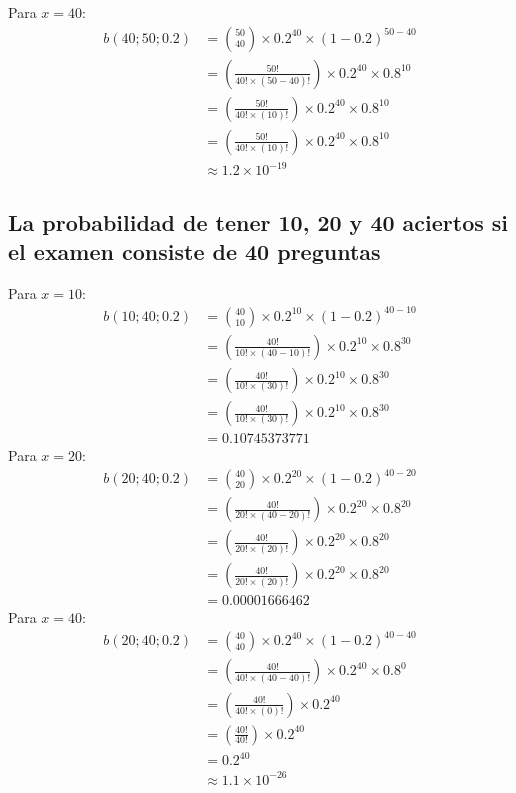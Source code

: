 \documentclass[12pt]{article}
\begin{document}
Para $x=40$:\\
\begin{equation}
\begin{split}
b(40;50;0.2)&={50\choose 40} \times 0.2^{40} \times (1 - 0.2)^{50-40}\\
&=(\frac{50!}{40!\times(50-40)!}) \times 0.2^{40} \times 0.8^{10}\\
&=(\frac{50!}{40!\times(10)!}) \times 0.2^{40} \times 0.8^{10}\\
&=(\frac{50!}{40!\times(10)!}) \times 0.2^{40} \times 0.8^{10}\\
&\approx 1.2 \times 10^{-19}
\end{split} 
\end{equation}
\subsection{La probabilidad de tener 10, 20 y 40 aciertos si el examen consiste de 40 preguntas}
Para $x=10$:\\
\begin{equation}
\begin{split}
b(10;40;0.2)&={40\choose 10} \times 0.2^{10} \times (1 - 0.2)^{40-10}\\
&=(\frac{40!}{10!\times(40-10)!}) \times 0.2^{10} \times 0.8^{30}\\
&=(\frac{40!}{10!\times(30)!}) \times 0.2^{10} \times 0.8^{30}\\
&=(\frac{40!}{10!\times(30)!}) \times 0.2^{10} \times 0.8^{30}\\
&= 0.10745373771
\end{split} 
\end{equation}
Para $x=20$:\\
\begin{equation}
\begin{split}
b(20;40;0.2)&={40\choose 20} \times 0.2^{20} \times (1 - 0.2)^{40-20}\\
&=(\frac{40!}{20!\times(40-20)!}) \times 0.2^{20} \times 0.8^{20}\\
&=(\frac{40!}{20!\times(20)!}) \times 0.2^{20} \times 0.8^{20}\\
&=(\frac{40!}{20!\times(20)!}) \times 0.2^{20} \times 0.8^{20}\\
&= 0.00001666462
\end{split} 
\end{equation}
Para $x=40$:\\
\begin{equation}
\begin{split}
b(20;40;0.2)&={40\choose 40} \times 0.2^{40} \times (1 - 0.2)^{40-40}\\
&=(\frac{40!}{40!\times(40-40)!}) \times 0.2^{40} \times 0.8^{0}\\
&=(\frac{40!}{40!\times(0)!}) \times 0.2^{40} \\
&=(\frac{40!}{40!}) \times 0.2^{40} \\
&= 0.2^{40} \\
&\approx 1.1 \times 10^{-26}
\end{split} 
\end{equation}
\end{document}

